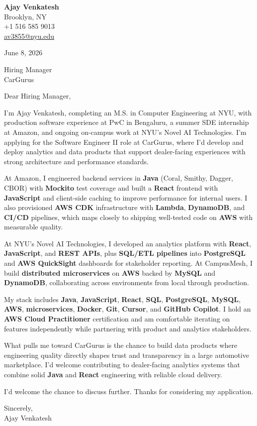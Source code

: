 \documentclass[letterpaper,11pt]{article}
\begin{document}
\begin{flushleft}
\textbf{\large Ajay Venkatesh} \\
Brooklyn, NY \\
+1 516 585 9013 \\
\href{mailto:av3855@nyu.edu}{av3855@nyu.edu}
\end{flushleft}
\vspace{10pt}
June 8, 2026
\vspace{6pt}

Hiring Manager \\
CarGurus

\vspace{10pt}

Dear Hiring Manager,

I'm Ajay Venkatesh, completing an M.S. in Computer Engineering at NYU, with production software experience at PwC in Bengaluru, a summer SDE internship at Amazon, and ongoing on-campus work at NYU's Novel AI Technologies. I'm applying for the Software Engineer II role at CarGurus, where I'd develop and deploy analytics and data products that support dealer-facing experiences with strong architecture and performance standards.

At Amazon, I engineered backend services in \textbf{Java} (Coral, Smithy, Dagger, CBOR) with \textbf{Mockito} test coverage and built a \textbf{React} frontend with \textbf{JavaScript} and client-side caching to improve performance for internal users. I also provisioned \textbf{AWS CDK} infrastructure with \textbf{Lambda}, \textbf{DynamoDB}, and \textbf{CI/CD} pipelines, which maps closely to shipping well-tested code on \textbf{AWS} with measurable quality.

At NYU's Novel AI Technologies, I developed an analytics platform with \textbf{React}, \textbf{JavaScript}, and \textbf{REST APIs}, plus \textbf{SQL/ETL pipelines} into \textbf{PostgreSQL} and \textbf{AWS QuickSight} dashboards for stakeholder reporting. At CampusMesh, I build \textbf{distributed microservices} on \textbf{AWS} backed by \textbf{MySQL} and \textbf{DynamoDB}, collaborating across environments from local through production.

My stack includes \textbf{Java}, \textbf{JavaScript}, \textbf{React}, \textbf{SQL}, \textbf{PostgreSQL}, \textbf{MySQL}, \textbf{AWS}, \textbf{microservices}, \textbf{Docker}, \textbf{Git}, \textbf{Cursor}, and \textbf{GitHub Copilot}. I hold an \textbf{AWS Cloud Practitioner} certification and am comfortable iterating on features independently while partnering with product and analytics stakeholders.

What pulls me toward CarGurus is the chance to build data products where engineering quality directly shapes trust and transparency in a large automotive marketplace. I'd welcome contributing to dealer-facing analytics systems that combine solid \textbf{Java} and \textbf{React} engineering with reliable cloud delivery.

I'd welcome the chance to discuss further. Thanks for considering my application.

\vspace{12pt}
Sincerely, \\
Ajay Venkatesh
\end{document}
